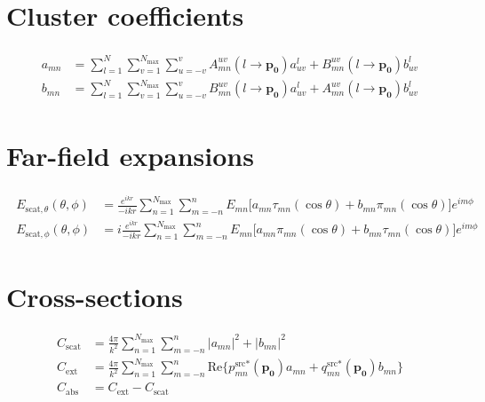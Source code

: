 \documentclass[11pt]{article}
\begin{document}
\section{Cluster coefficients}
\begin{align}
\begin{split}
    a_{mn} &= \sum_{l=1}^N\sum_{v=1}^{N_\text{max}} \sum_{u=-v}^{v}
    A_{mn}^{uv}(l \rightarrow \boldsymbol{p_0}) a_{uv}^{l}
    +B_{mn}^{uv}(l \rightarrow \boldsymbol{p_0}) b_{uv}^{l} \\
    b_{mn} &= \sum_{l=1}^N\sum_{v=1}^{N_\text{max}} \sum_{u=-v}^{v}
    B_{mn}^{uv}(l \rightarrow \boldsymbol{p_0}) a_{uv}^{l}
    +A_{mn}^{uv}(l \rightarrow \boldsymbol{p_0}) b_{uv}^{l}
\end{split}
\end{align}

\section{Far-field expansions}

\begin{align}
\begin{split}
    E_{\text{scat},\theta}(\theta,\phi) &= \frac{e^{ikr}}{-ikr} \sum_{n=1}^{N_\text{max}} \sum_{m=-n}^{n}
    E_{mn} \big[a_{mn}\tau_{mn}(\cos\theta) + b_{mn}\pi_{mn}(\cos\theta)\big] e^{im\phi} \\
    E_{\text{scat},\phi}(\theta,\phi) &= i\frac{e^{ikr}}{-ikr} \sum_{n=1}^{N_\text{max}} \sum_{m=-n}^{n}
    E_{mn} \big[a_{mn}\pi_{mn}(\cos\theta) + b_{mn}\tau_{mn}(\cos\theta)\big] e^{im\phi}
\end{split}
\end{align}

\section{Cross-sections}

\begin{align}
    C_\text{scat} &= \frac{4\pi}{k^2} \sum_{n=1}^{N_\text{max}} \sum_{m=-n}^{n}
    |a_{mn}|^2 + |b_{mn}|^2 \\
    C_\text{ext} &= \frac{4\pi}{k^2} \sum_{n=1}^{N_\text{max}} \sum_{m=-n}^{n}
    \text{Re} \bigg\{ p_{mn}^{\text{src}*}(\boldsymbol{p_0}) a_{mn} 
    + q_{mn}^{\text{src}*}(\boldsymbol{p_0})b_{mn} \bigg\} \\
    C_\text{abs} &= C_\text{ext} - C_\text{scat}
\end{align}
\end{document}

